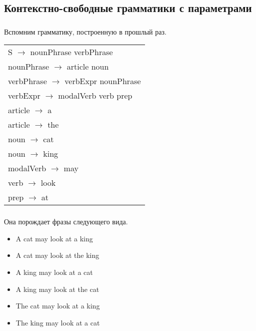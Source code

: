 \subsection{Контекстно-свободные грамматики с параметрами}


\begin{frame}

	\frametitle{\insertsection}
	\framesubtitle{\insertsubsection}
	
	Вспомним грамматику, построенную в прошлый раз.
	
	\begin{table}
		\centering
		\begin{tabular}{ l }
			\rowcolor{LightGray} S \(\rightarrow \) nounPhrase verbPhrase \\
			\rowcolor{LightGray} nounPhrase \(\rightarrow \) article noun \\
			\rowcolor{LightGray} verbPhrase \(\rightarrow \) verbExpr nounPhrase \\
			\rowcolor{LightGray} verbExpr \(\rightarrow \) modalVerb verb prep \\
			\rowcolor{LightGray} article \(\rightarrow \) a \\
			\rowcolor{LightGray} article \(\rightarrow \) the \\
			\rowcolor{LightGray} noun \(\rightarrow \) cat \\
			\rowcolor{LightGray} noun \(\rightarrow \) king \\
			\rowcolor{LightGray} modalVerb \(\rightarrow \) may \\
			\rowcolor{LightGray} verb \(\rightarrow \) look \\
			\rowcolor{LightGray} prep \(\rightarrow \) at
		\end{tabular}
	\end{table}

\end{frame}



\begin{frame}

	\frametitle{\insertsection}
	\framesubtitle{\insertsubsection}
	
	Она порождает фразы следующего вида.
	
	\begin{itemize}
		\item A cat may look at a king
		\item A cat may look at the king
		\item A king may look at a cat
		\item A king may look at the cat
		\item The cat may look at a king
		\item The king may look at a cat
	\end{itemize}

\end{frame}


